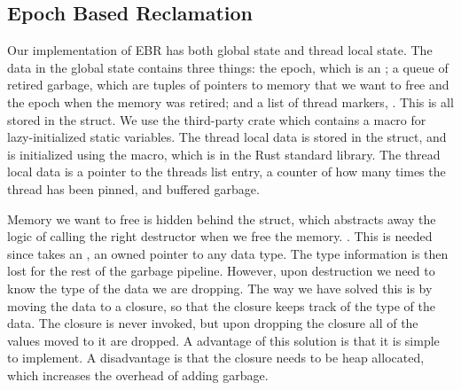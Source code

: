 \documentclass[b5paper]{report}
\begin{document}
\subsection{Epoch Based Reclamation}

Our implementation of EBR has both global state and thread local state. The data
in the global state contains three things: the epoch, which is an
; a queue of retired garbage, which are tuples of pointers to
memory that we want to free and the epoch when the memory was retired; and a
list of thread markers, . This is all stored in the
 struct. We use the third-party crate 
which contains a macro for lazy-initialized static variables. The thread local
data is stored in the  struct, and is initialized using the
 macro, which is in the Rust standard library. The thread
local data is a pointer to the threads list entry, a counter of how many times
the thread has been pinned, and buffered garbage.

Memory we want to free is hidden behind the  struct, which
abstracts away the logic of calling the right destructor when we free the
memory. . This is needed since
 takes an , an owned pointer to
any data type. The type information is then lost for the rest of the garbage
pipeline. However, upon destruction we need to know the type of the data we are
dropping. The way we have solved this is by moving the data to a closure, so
that the closure keeps track of the type of the data. The closure is never
invoked, but upon dropping the closure all of the values moved to it are
dropped. A advantage of this solution is that it is simple to implement. A
disadvantage is that the closure needs to be heap allocated, which increases the
overhead of adding garbage.  
\end{document}
